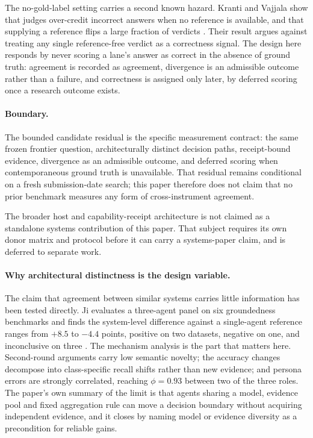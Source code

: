 The no-gold-label setting carries a second known hazard. Kranti and Vajjala show that judges over-credit incorrect answers when no reference is available, and that supplying a reference flips a large fraction of verdicts \cite{kranti2026generous}. Their result argues against treating any single reference-free verdict as a correctness signal. The design here responds by never scoring a lane's answer as correct in the absence of ground truth: agreement is recorded as agreement, divergence is an admissible outcome rather than a failure, and correctness is assigned only later, by deferred scoring once a research outcome exists.

\paragraph{Boundary.}
The bounded candidate residual is the specific measurement contract: the same frozen frontier question, architecturally distinct decision paths, receipt-bound evidence, divergence as an admissible outcome, and deferred scoring when contemporaneous ground truth is unavailable. That residual remains conditional on a fresh submission-date search; this paper therefore does not claim that no prior benchmark measures any form of cross-instrument agreement.

The broader host and capability-receipt architecture is not claimed as a standalone systems contribution of this paper. That subject requires its own donor matrix and protocol before it can carry a systems-paper claim, and is deferred to separate work.

\paragraph{Why architectural distinctness is the design variable.}
The claim that agreement between similar systems carries little information has been tested directly. Ji evaluates a three-agent panel on six groundedness benchmarks and finds the system-level difference against a single-agent reference ranges from $+8.5$ to $-4.4$ points, positive on two datasets, negative on one, and inconclusive on three \cite{ji2026moredebate}. The mechanism analysis is the part that matters here. Second-round arguments carry low semantic novelty; the accuracy changes decompose into class-specific recall shifts rather than new evidence; and persona errors are strongly correlated, reaching $\phi = 0.93$ between two of the three roles. The paper's own summary of the limit is that agents sharing a model, evidence pool and fixed aggregation rule can move a decision boundary without acquiring independent evidence, and it closes by naming model or evidence diversity as a precondition for reliable gains.

